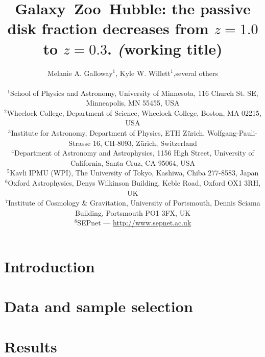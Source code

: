 \documentclass[useAMS,usenatbib]{mn2e}
\begin{document}
\title[Galaxy~Zoo: passive disk fraction]{Galaxy~Zoo~Hubble: the passive disk fraction decreases from $z=1.0$ to $z=0.3$. \emph(working title)}
\author[Galloway et~al.]{\parbox[t]{16cm}{Melanie A. Galloway$^1$, Kyle W. Willett$^1$,several others
\vspace{0.1in} }\\
$^{1}$School of Physics and Astronomy, University of Minnesota, 116 Church St. SE, Minneapolis, MN 55455, USA\\
$^{2}$Wheelock College, Department of Science, Wheelock College, Boston, MA 02215, USA\\
$^{3}$Institute for Astronomy, Department of Physics, ETH Z\"urich, Wolfgang-Pauli-Strasse 16, CH-8093, Z\"urich, Switzerland\\
$^{4}$Department of Astronomy and Astrophysics, 1156 High Street, University of California, Santa Cruz, CA 95064, USA\\
$^{5}$Kavli IPMU (WPI), The University of Tokyo, Kashiwa, Chiba 277-8583, Japan\\
$^{6}$Oxford Astrophysics, Denys Wilkinson Building, Keble Road, Oxford OX1 3RH, UK\\
$^{7}$Institute of Cosmology \& Gravitation, University of Portsmouth, Dennis Sciama Building, Portsmouth PO1 3FX, UK\\
$^{8}$SEPnet --- \url{http://www.sepnet.ac.uk} \\
   }
\maketitle

\begin{abstract}


\end{abstract}

\section{Introduction}
\label{sec:Intro}

\section{Data and sample selection}
\label{sec:Sample Selection}


\section{Results}
\label{sec:Results}
\end{document}
